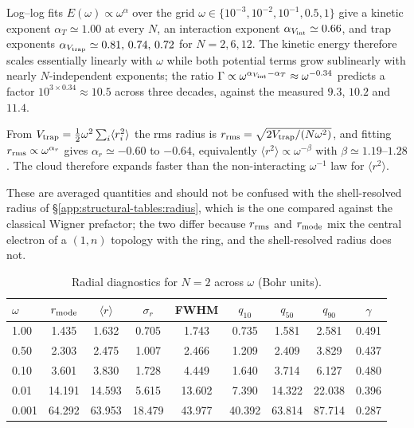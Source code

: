Log--log fits $E(\omega)\propto\omega^{\alpha}$ over the grid
$\omega\in\{10^{-3},10^{-2},10^{-1},0.5,1\}$ give a kinetic exponent
$\alpha_T\simeq1.00$ at every $N$, an interaction exponent
$\alpha_{V_{\rm int}}\simeq0.66$, and trap exponents
$\alpha_{V_{\rm trap}}\simeq0.81,\,0.74,\,0.72$ for $N=2,6,12$. The kinetic energy therefore
scales essentially linearly with $\omega$ while both potential terms grow sublinearly with
nearly $N$-independent exponents; the ratio $\Gamma\propto\omega^{\alpha_{V_{\rm
int}}-\alpha_T}\approx\omega^{-0.34}$ predicts a factor $10^{3\times0.34}\approx10.5$ across
three decades, against the measured $9.3$, $10.2$ and $11.4$.

From $V_{\rm trap}=\tfrac12\omega^2\sum_i\langle r_i^2\rangle$ the rms radius is
$r_{\rm rms}=\sqrt{2V_{\rm trap}/(N\omega^2)}$, and fitting
$r_{\rm rms}\propto\omega^{\alpha_r}$ gives $\alpha_r\simeq-0.60$ to $-0.64$, equivalently
$\langle r^2\rangle\propto\omega^{-\beta}$ with $\beta\simeq1.19$--$1.28$. The cloud
therefore expands faster than the non-interacting $\omega^{-1}$ law for $\langle r^2\rangle$.

These are averaged quantities and should not be confused with the shell-resolved radius of
\S\ref{app:structural-tables:radius}, which is the one compared against the classical Wigner
prefactor; the two differ because $r_{\rm rms}$ and $r_{\rm mode}$ mix the central electron
of a $(1,n)$ topology with the ring, and the shell-resolved radius does not.

\begin{table}[H]
\centering
\caption{Radial diagnostics for $N{=}2$ across $\omega$ (Bohr units).}
\label{tab:two_e_summary}
\begin{tabular}{lcccccccc}
\toprule
$\omega$
& $r_{\rm mode}$
& $\langle r\rangle$
& $\sigma_r$
& FWHM
& $q_{10}$
& $q_{50}$
& $q_{90}$
& $\gamma$ \\
\midrule
1.00  & 1.435  & 1.632  & 0.705  & 1.743  & 0.735  & 1.581  & 2.581  & 0.491 \\
0.50  & 2.303  & 2.475  & 1.007  & 2.466  & 1.209  & 2.409  & 3.829  & 0.437 \\
0.10  & 3.601  & 3.830  & 1.728  & 4.449  & 1.640  & 3.714  & 6.127  & 0.480 \\
0.01  & 14.191 & 14.593 & 5.615  & 13.602 & 7.390  & 14.322 & 22.038 & 0.396 \\
0.001 & 64.292 & 63.953 & 18.479 & 43.977 & 40.392 & 63.814 & 87.714 & 0.287 \\
\bottomrule
\end{tabular}
\end{table}

